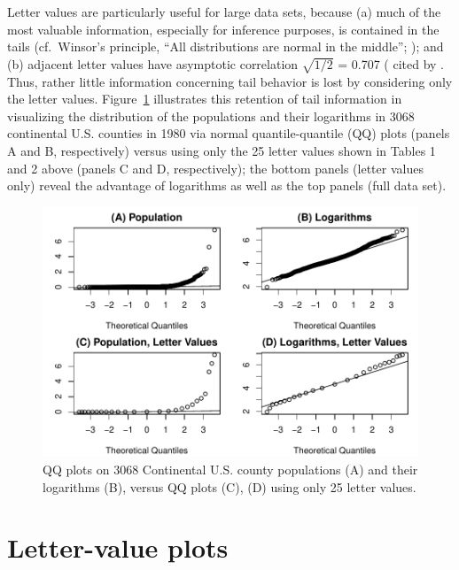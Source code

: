 \documentclass[oneside]{article}
\begin{document}
Letter values are particularly useful for large data sets, because (a) much of the most valuable information, especially for inference purposes, is contained in the tails (cf.\ Winsor's principle, ``All distributions are normal in the middle''; \citep[pg. 457]{tukey60}); and (b) adjacent letter values have asymptotic correlation $\sqrt{1/2}$ = 0.707 (\citet{mosteller46} cited by \citet[pg. 51--52]{dchlv}. Thus, rather little information concerning tail behavior is lost by considering only the letter values. Figure~\ref{qqpop4} illustrates this retention of tail information in visualizing the distribution of the populations and their logarithms in 3068 continental U.S. counties in 1980 via normal quantile-quantile (QQ) plots (panels A and B, respectively) versus using only the 25 letter values shown in Tables 1 and 2 above (panels C and D, respectively); the bottom panels (letter values only) reveal the advantage of logarithms as well as the top panels (full data set).

\begin{figure}[hbtp]
  \centering
  \includegraphics[width = 0.75 \linewidth]{counties-qq}

  \caption{QQ plots on 3068 Continental U.S. county populations (A) and their
  logarithms (B), versus QQ plots (C), (D) using only 25 letter values.}
  \label{qqpop4}
\end{figure}

\section{Letter-value plots}
\label{sec:lv-boxplots}
\end{document}
